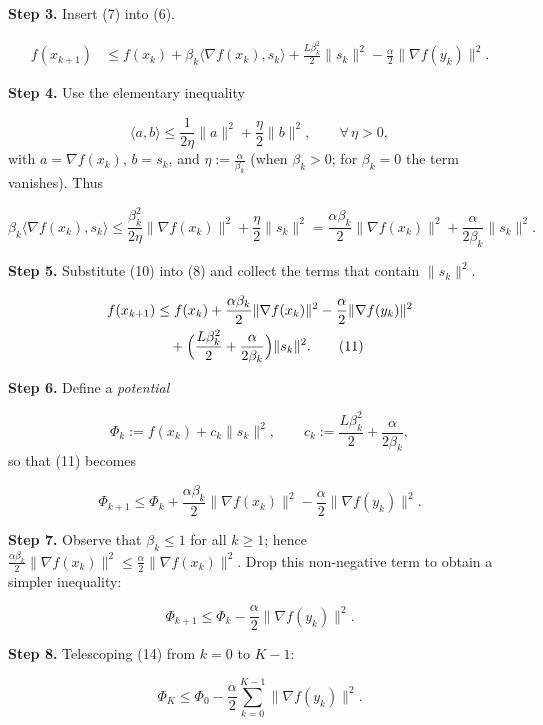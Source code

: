 \documentclass[11pt]{article}
\newcommand{\grad}{\nabla}
\begin{document}
\noindent\textbf{Step 3.}  Insert (7) into (6).  

\[
\begin{aligned}
f(x_{k+1})
&\le f(x_k)+\beta_k\langle\grad f(x_k),s_k\rangle
      +\frac{L\beta_k^{2}}{2}\|s_k\|^{2}
      -\frac{\alpha}{2}\|\grad f(y_k)\|^{2}.
\tag{8}
\end{aligned}
\]

\noindent\textbf{Step 4.}  Use the elementary inequality  

\[
\langle a,b\rangle\le \frac{1}{2\eta}\|a\|^{2}
                     +\frac{\eta}{2}\|b\|^{2},
\qquad\forall\,\eta>0,
\tag{9}
\]
with \(a=\grad f(x_k)\), \(b=s_k\), and \(\eta:=\frac{\alpha}{\beta_k}\) (when \(\beta_k>0\); for \(\beta_k=0\) the term vanishes).  
Thus

\[
\beta_k\langle\grad f(x_k),s_k\rangle
\le \frac{\beta_k^{2}}{2\eta}\|\grad f(x_k)\|^{2}
   +\frac{\eta}{2}\|s_k\|^{2}
= \frac{\alpha\beta_k}{2}\|\grad f(x_k)\|^{2}
  +\frac{\alpha}{2\beta_k}\|s_k\|^{2}.
\tag{10}
\]

\noindent\textbf{Step 5.}  Substitute (10) into (8) and collect the terms that contain \(\|s_k\|^{2}\).

\[
\begin{aligned}
f(x_{k+1})
&\le f(x_k)
   +\frac{\alpha\beta_k}{2}\|\grad f(x_k)\|^{2}
   -\frac{\alpha}{2}\|\grad f(y_k)\|^{2}\\
&\quad+\Bigl(\frac{L\beta_k^{2}}{2}
            +\frac{\alpha}{2\beta_k}\Bigr)\|s_k\|^{2}.
\tag{11}
\end{aligned}
\]

\noindent\textbf{Step 6.}  Define a \emph{potential}  

\[
\Phi_k:= f(x_k)+c_k\|s_k\|^{2},
\qquad
c_k:=\frac{L\beta_k^{2}}{2}+\frac{\alpha}{2\beta_k},
\tag{12}
\]
so that (11) becomes

\[
\Phi_{k+1}\le
\Phi_k
   +\frac{\alpha\beta_k}{2}\|\grad f(x_k)\|^{2}
   -\frac{\alpha}{2}\|\grad f(y_k)\|^{2}.
\tag{13}
\]

\noindent\textbf{Step 7.}  Observe that \(\beta_k\le 1\) for all \(k\ge1\); hence \(\frac{\alpha\beta_k}{2}\|\grad f(x_k)\|^{2}\le\frac{\alpha}{2}\|\grad f(x_k)\|^{2}\).  
Drop this non‑negative term to obtain a simpler inequality:

\[
\Phi_{k+1}\le\Phi_k-\frac{\alpha}{2}\|\grad f(y_k)\|^{2}.
\tag{14}
\]

\noindent\textbf{Step 8.}  Telescoping (14) from \(k=0\) to \(K-1\):

\[
\Phi_{K}\le\Phi_{0}-\frac{\alpha}{2}\sum_{k=0}^{K-1}\|\grad f(y_k)\|^{2}.
\tag{15}
\]
\end{document}
